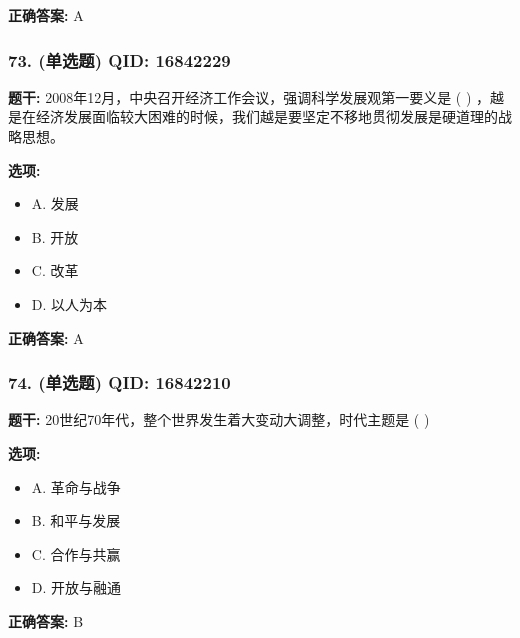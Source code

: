 \documentclass[12pt,UTF8]{ctexart}
\begin{document}
\textbf{正确答案:}
A

\vspace{0.3em}\hrulefill\vspace{0.7em}

\subsubsection*{73. (单选题) \small QID: 16842229}

\textbf{题干:}
2008年12月，中央召开经济工作会议，强调科学发展观第一要义是 ( ) ，越是在经济发展面临较大困难的时候，我们越是要坚定不移地贯彻发展是硬道理的战略思想。

\textbf{选项:}
\begin{itemize}[leftmargin=*]

  \item A. 发展

  \item B. 开放

  \item C. 改革

  \item D. 以人为本

\end{itemize}

\textbf{正确答案:}
A

\vspace{0.3em}\hrulefill\vspace{0.7em}

\subsubsection*{74. (单选题) \small QID: 16842210}

\textbf{题干:}
20世纪70年代，整个世界发生着大变动大调整，时代主题是 ( )

\textbf{选项:}
\begin{itemize}[leftmargin=*]

  \item A. 革命与战争

  \item B. 和平与发展

  \item C. 合作与共赢

  \item D. 开放与融通

\end{itemize}

\textbf{正确答案:}
B

\vspace{0.3em}\hrulefill\vspace{0.7em}
\end{document}
